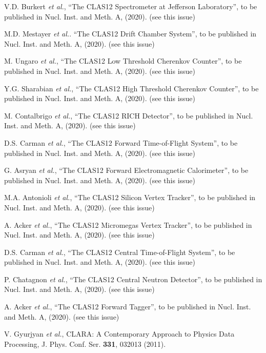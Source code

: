 \documentclass[3p,times,twocolumn]{elsarticle}
\begin{document}
\begin{thebibliography}{99}

V.D. Burkert {\it et al.}, ``The CLAS12 Spectrometer at Jefferson Laboratory'', to be published in Nucl.
Inst. and Meth. A, (2020). (see this issue)

M.D. Mestayer {\it et al.}. ``The CLAS12 Drift Chamber System'', to be published in Nucl. Inst. and
Meth. A, (2020). (see this issue)

M. Ungaro {\it et al.}, ``The CLAS12 Low Threshold Cherenkov Counter'', to be published in Nucl. Inst.
and Meth. A, (2020). (see this issue)

Y.G. Sharabian {\it et al.}, ``The CLAS12 High Threshold Cherenkov Counter'', to be published in Nucl. Inst.
and Meth. A, (2020). (see this issue)
  
M. Contalbrigo {\it et al.}, ``The CLAS12 RICH Detector'', to be published in Nucl. Inst. and
Meth. A, (2020). (see this issue)

D.S. Carman {\it et al.},   ``The CLAS12 Forward Time-of-Flight System'', to be published in Nucl.
Inst. and Meth. A, (2020). (see this issue)

G. Asryan {\it et al.}, ``The CLAS12 Forward Electromagnetic Calorimeter'', to be published in Nucl. Inst. and
Meth. A, (2020). (see this issue)

M.A. Antonioli {\it et al.}, ``The CLAS12 Silicon Vertex Tracker'', to be published in Nucl. Inst. and
Meth. A, (2020). (see this issue)

A. Acker {\it et al.}, ``The CLAS12 Micromegas Vertex Tracker'', to be published in Nucl. Inst. and
Meth. A, (2020). (see this issue)

D.S. Carman {\it et al.}, ``The CLAS12 Central Time-of-Flight System'', to be published in Nucl.
Inst. and Meth. A, (2020). (see this issue)

P. Chatagnon {\it et al.}, ``The CLAS12 Central Neutron Detector'', to be published in Nucl. Inst. and
Meth. A, (2020). (see this issue)

A. Acker {\it et al.}, ``The CLAS12 Forward Tagger'', to be published in Nucl. Inst. and
Meth. A, (2020). (see this issue)

V. Gyurjyan {\it et al.}, CLARA: A Contemporary Approach to Physics Data Processing, J. Phys. Conf. Ser.
{\bf 331}, 032013 (2011).


\end{thebibliography}
\end{document}
